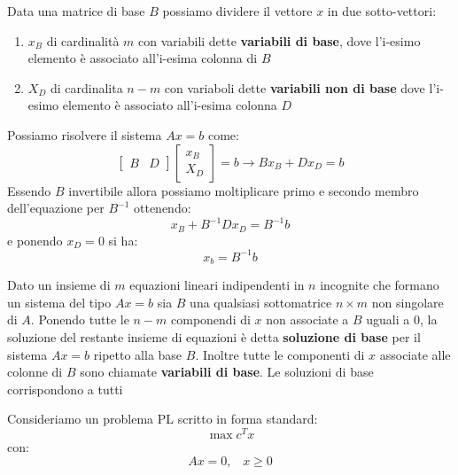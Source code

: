 \documentclass[a4paper,12pt, oneside]{book}
\begin{document}
Data una matrice di base $B$ possiamo dividere il vettore $x$ in due
sotto-vettori:
\begin{enumerate}
  \item $x_B$ di cardinalità $m$ con variabili dette \textbf{variabili
    di base}, dove l'i-esimo  elemento è associato all'i-esima colonna di $B$
  \item $X_D$ di cardinalita $n-m$ con variaboli dette
  \textbf{variabili non di base} dove l'i-esimo elemento è associato
  all'i-esima colonna $D$
\end{enumerate}
Possiamo risolvere il sistema $Ax=b$ come:
\[
  \left[
    \begin{matrix}
      B & D
    \end{matrix}
  \right]\left[
    \begin{matrix}
      x_B\\
      X_D
    \end{matrix}
  \right]=b\longrightarrow Bx_B+Dx_D=b
\]
Essendo $B$ invertibile allora possiamo moltiplicare primo e secondo
membro dell'equazione per $B^{-1}$ ottenendo:
\[x_B+B^{-1}Dx_D=B^{-1}b\]
e ponendo $x_D=0$ si ha:
\[x_b=B^{-1}b\]
\begin{definizione}
  Dato un insieme di $m$ equazioni lineari indipendenti in $n$
  incognite che formano un sistema del tipo $Ax=b$ sia $B$ una
  qualsiasi sottomatrice $n\times m$ non singolare di $A$. Ponendo
  tutte le $n-m$ componendi di $x$ non associate a $B$ uguali a 0, la
  soluzione del restante insieme di equazioni è detta
  \textbf{soluzione di base} per il sistema $Ax=b$ ripetto alla base
  $B$. Inoltre tutte le componenti di $x$ associate alle colonne di
  $B$ sono chiamate \textbf{variabili di base}. Le soluzioni di base
  corrispondono a tutti 
\end{definizione}
Consideriamo un problema PL scritto in forma standard:
\[\max c^Tx\]
con:
\[Ax=0,\,\,\,\,\,x\geq 0\]
\end{document}
